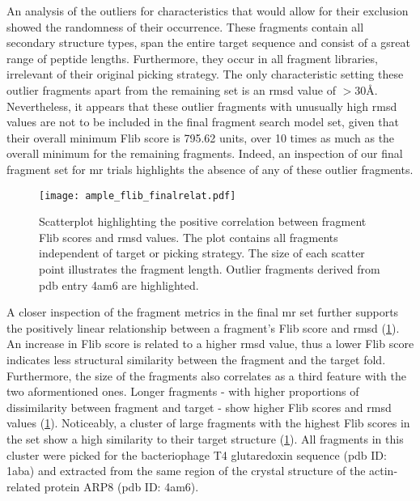 An analysis of the outliers for characteristics that would allow for their exclusion showed the randomness of their occurrence. These fragments contain all secondary structure types, span the entire target sequence and consist of a gsreat range of peptide lengths. Furthermore, they occur in all fragment libraries, irrelevant of their original picking strategy. The only characteristic setting these outlier fragments apart from the remaining set is an \gls{rmsd} value of $>30$\AA. Nevertheless, it appears that these outlier fragments with unusually high \gls{rmsd} values are not to be included in the final fragment search model set, given that their overall minimum Flib score is 795.62 units, over 10 times as much as the overall minimum for the remaining fragments. Indeed, an inspection of our final fragment set for \gls{mr} trials highlights the absence of any of these outlier fragments.

\begin{figure}[H]
	\centering
	\texttt{[image: ample\_flib\_finalrelat.pdf]}
	\caption[Correlation analysis for final Flib \gls{mr} fragments]{Scatterplot highlighting the positive correlation between fragment Flib scores and \gls{rmsd} values. The plot contains all fragments independent of target or picking strategy. The size of each scatter point illustrates the fragment length. Outlier fragments derived from \gls{pdb} entry 4am6 are highlighted.}
	\label{fig:ample_flib_finalrelat}
\end{figure}

A closer inspection of the fragment metrics in the final \gls{mr} set further supports the positively linear relationship between a fragment's Flib score and \gls{rmsd} (\cref{fig:ample_flib_finalrelat}). An increase in Flib score is related to a higher \gls{rmsd} value, thus a lower Flib score indicates less structural similarity between the fragment and the target fold. Furthermore, the size of the fragments also correlates as a third feature with the two aformentioned ones. Longer fragments - with higher proportions of dissimilarity between fragment and target - show higher Flib scores and \gls{rmsd} values (\cref{fig:ample_flib_finalrelat}). Noticeably, a cluster of large fragments with the highest Flib scores in the set show a high similarity to their target structure (\cref{fig:ample_flib_finalrelat}). All fragments in this cluster were picked for the bacteriophage T4 glutaredoxin sequence (\gls{pdb} ID: 1aba) and extracted from the same region of the crystal structure of the actin-related protein ARP8 (\gls{pdb} ID: 4am6). 

